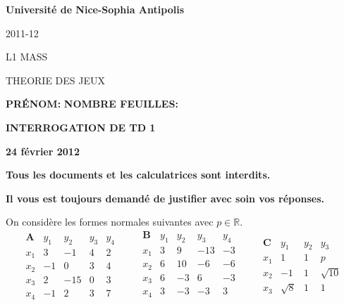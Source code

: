 \documentclass[french,11pt,leqno]{article}
\newcommand{\R}{\mathbb{R}}
\newcounter{exocount}
\newcounter{questcount}
\def\exo{\bigskip\noindent{\bf Exercice \theexocount {} -}
  \addtocounter{exocount}{1} \setcounter{questcount}{1}}
\begin{document}
\begin{center}
{\bf Universit\'e de Nice-Sophia Antipolis}
\end{center}
\bigskip

\flushright

 2011-12

 L1 MASS 

 THEORIE DES JEUX 

\flushleft

\vskip1cm

 \hspace{5cm} {\bf PR\'ENOM:} \hspace{4cm} {\bf NOMBRE FEUILLES:}


\vskip1cm

\begin{center}
{\bf  INTERROGATION DE TD 1}

{\bf 24 f\'evrier 2012 }
\end{center}

\medskip

{\bf \noindent Tous les documents et les calculatrices sont interdits.} 

\smallskip

{\bf \noindent Il vous est toujours demand\'e de justifier avec soin vos r\'eponses.} 

\medskip



\exo
On consid\`ere les formes normales suivantes avec $p\in \R$.
\begin{equation*}
\begin{array}{l|rrrr}
\mathbf{A} & y_1 & y_2 & y_3 & y_4 \\ \hline
x_1& 3&-1& 4 & 2\\
x_2&-1& 0 &3&4\\
x_3&2&-15&0&3\\
x_4&-1&2&3&7
\end{array}
% 
\qquad
%
\begin{array}{l|rrrr}
\mathbf{B}   & y_1 & y_2 & y_3 & y_4\\ \hline
x_1 &  3 & 9 & -13 & -3 \\
x_2 &  6 & 10 & -6 & -6 \\
x_3 &  6 & -3 & 6 & -3 \\
x_4 &  3 & -3 & -3 & 3 \\ 
\end{array}
%
\qquad
%
\begin{array}{l|rrr}
\mathbf{C}& y_1&y_2&y_3 \\ \hline
x_1& 1&1&p\\
x_2& -1&1&\sqrt{10}\\
x_3&\sqrt{8}&1& 1
\end{array}
\end{equation*}
\end{document}
